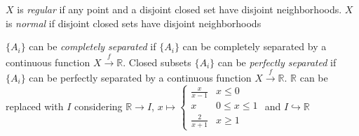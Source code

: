 \documentclass[main]{subfiles}
\begin{document}
\begin{definition}
$X$ is \textit{regular} if any point and a disjoint closed set have disjoint neighborhoods. $X$ is \textit{normal} if disjoint closed sets have disjoint neighborhoods
\end{definition}

\begin{definition}
$\{A_i\}$ can be \textit{completely separated} if $\{A_i\}$ can be completely separated by a continuous function $X\xrightarrow{f}\mathbb R$. Closed subsets $\{A_i\}$ can be \textit{perfectly separated} if $\{A_i\}$ can be perfectly separated by a continuous function $X\xrightarrow{f}\mathbb R$. $\mathbb R$ can be replaced with $I$ considering $\mathbb R\to I$, $x\mapsto\begin{cases}
\frac{x}{x-1} &x\leq0 \\
x &0\leq x\leq1 \\
\frac{2}{x+1} &x\geq1
\end{cases}$ and $I\hookrightarrow\mathbb R$
\begin{figure}[h!]
\centering
{}
\end{figure}
\end{definition}
\end{document}
